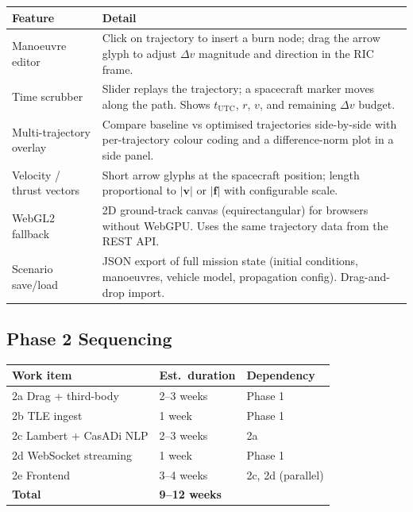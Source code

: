 \documentclass[11pt, a4paper]{article}
\begin{document}
\begin{center}
\begin{tabularx}{\textwidth}{L{3.5cm} X}
  \toprule
  \textbf{Feature} & \textbf{Detail} \\
  \midrule
  Manoeuvre editor &
    Click on trajectory to insert a burn node; drag the arrow glyph to adjust
    $\Delta v$ magnitude and direction in the RIC frame. \\[4pt]
  Time scrubber &
    Slider replays the trajectory; a spacecraft marker moves along the path.
    Shows $t_\text{UTC}$, $r$, $v$, and remaining $\Delta v$ budget. \\[4pt]
  Multi-trajectory overlay &
    Compare baseline vs optimised trajectories side-by-side with per-trajectory
    colour coding and a difference-norm plot in a side panel. \\[4pt]
  Velocity / thrust vectors &
    Short arrow glyphs at the spacecraft position; length proportional to
    $|\mathbf{v}|$ or $|\mathbf{f}|$ with configurable scale. \\[4pt]
  WebGL2 fallback &
    2D ground-track canvas (equirectangular) for browsers without WebGPU.
    Uses the same trajectory data from the REST API. \\[4pt]
  Scenario save/load &
    JSON export of full mission state (initial conditions, manoeuvres,
    vehicle model, propagation config). Drag-and-drop import. \\
  \bottomrule
\end{tabularx}
\end{center}

\subsection{Phase 2 Sequencing}

\begin{center}
\begin{tabular}{L{5cm} C{2.5cm} L{5.5cm}}
  \toprule
  \textbf{Work item} & \textbf{Est.\ duration} & \textbf{Dependency} \\
  \midrule
  2a Drag + third-body     & 2--3 weeks & Phase 1 \\
  2b TLE ingest            & 1 week     & Phase 1 \\
  2c Lambert + CasADi NLP  & 2--3 weeks & 2a \\
  2d WebSocket streaming   & 1 week     & Phase 1 \\
  2e Frontend              & 3--4 weeks & 2c, 2d (parallel) \\
  \midrule
  \textbf{Total}           & \textbf{9--12 weeks} & \\
  \bottomrule
\end{tabular}
\end{center}
\end{document}
